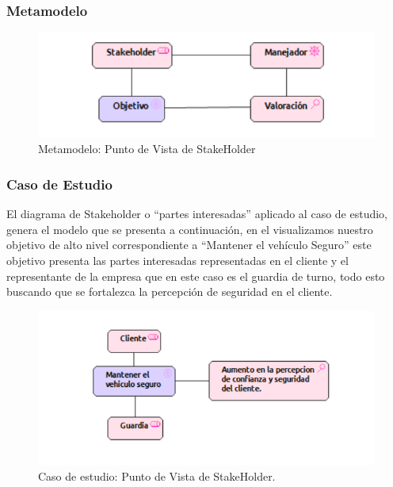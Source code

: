 \subsubsection{Metamodelo}
\begin{figure}[h]
	\centering
	\includegraphics[width=1.0\textwidth]{imagenes/Metamodelos/Motivacion/meta_Stakeholder.pdf}
	\caption{Metamodelo: Punto de Vista de StakeHolder}
	\label{fig:gap_analysis}
\end{figure}

\subsubsection{Caso de Estudio}
El diagrama de Stakeholder o “partes interesadas” aplicado al caso de estudio, genera el modelo que se presenta a continuación, en el visualizamos nuestro objetivo de alto nivel correspondiente a “Mantener el vehículo Seguro” este objetivo presenta las partes interesadas representadas en el cliente y el representante de la empresa que en este caso es el guardia de turno, todo esto buscando que se fortalezca la percepción de seguridad en el cliente.

\begin{figure}[h]
	\centering
	\includegraphics[width=1.0\textwidth]{imagenes/Caso_Estudio/Motivacion/Stakeholder.PDF}
	\caption{Caso de estudio: Punto de Vista de StakeHolder.}
	\label{fig:gap_analysis}
\end{figure}



